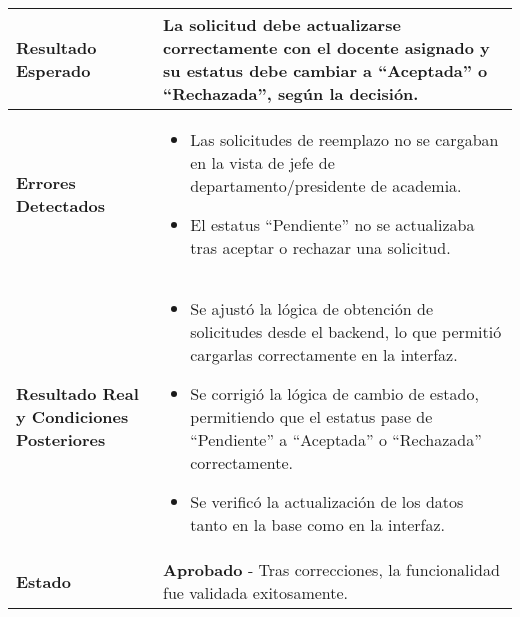 \begin{longtable}{|p{5cm}|p{10cm}|}
	\hline
	\textbf{Resultado Esperado} & 
	La solicitud debe actualizarse correctamente con el docente asignado y su estatus debe cambiar a “Aceptada” o “Rechazada”, según la decisión. \\
	\hline
	\textbf{Errores Detectados} & 
	\begin{itemize}
		\item Las solicitudes de reemplazo no se cargaban en la vista de jefe de departamento/presidente de academia.
		\item El estatus “Pendiente” no se actualizaba tras aceptar o rechazar una solicitud.
	\end{itemize} \\
	\hline
	\textbf{Resultado Real y Condiciones Posteriores} & 
	\begin{itemize}
		\item Se ajustó la lógica de obtención de solicitudes desde el backend, lo que permitió cargarlas correctamente en la interfaz.
		\item Se corrigió la lógica de cambio de estado, permitiendo que el estatus pase de “Pendiente” a “Aceptada” o “Rechazada” correctamente.
		\item Se verificó la actualización de los datos tanto en la base como en la interfaz.
	\end{itemize} \\
	\hline
	\textbf{Estado} & 
	\textbf{Aprobado} - Tras correcciones, la funcionalidad fue validada exitosamente. \\
	\hline
\end{longtable}
